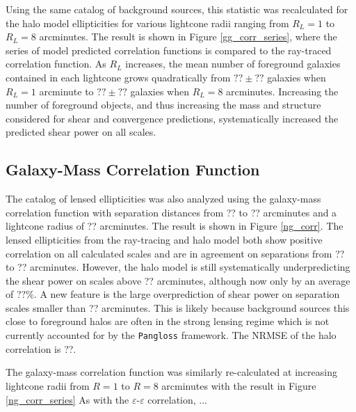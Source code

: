 \documentclass[%
 reprint,
 amsmath,amssymb,
 aps,nofootinbib
]{revtex4-1}
\begin{document}
Using the same catalog of background sources, this statistic was recalculated for the halo model ellipticities for various lightcone radii ranging from $R_L=1$ to $R_L=8$ arcminutes. The result is shown in Figure \ref{gg_corr_series}, where the series of model predicted correlation functions is compared to the ray-traced correlation function. As $R_L$ increases, the mean number of foreground galaxies contained in each lightcone grows quadratically from ${??\pm??}$ galaxies when $R_L=1$ arcminute to ${??\pm??}$ galaxies when $R_L=8$ arcminutes. Increasing the number of foreground objects, and thus increasing the mass and structure considered for shear and convergence predictions, systematically increased the predicted shear power on all scales. 



\subsection{Galaxy-Mass Correlation Function}

The catalog of lensed ellipticities was also analyzed using the galaxy-mass correlation function with separation distances from ?? to ?? arcminutes and a lightcone radius of ?? arcminutes. The result is shown in Figure \ref{ng_corr}. The lensed ellipticities from the ray-tracing and halo model both show positive correlation on all calculated scales and are in agreement on separations from ?? to ?? arcminutes. However, the halo model is still systematically underpredicting the shear power on scales above ?? arcminutes, although now only by an average of ??\%. A new feature is the large overprediction of shear power on separation scales smaller than ?? arcminutes. This is likely because background sources this close to foreground halos are often in the strong lensing regime which is not currently accounted for by the \texttt{Pangloss} framework. The NRMSE of the halo correlation is ??.

The galaxy-mass correlation function was similarly re-calculated at increasing lightcone radii from $R=1$ to $R=8$ arcminutes with the result in Figure \ref{ng_corr_series} As with the $\varepsilon$-$\varepsilon$ correlation, ...
\end{document}
